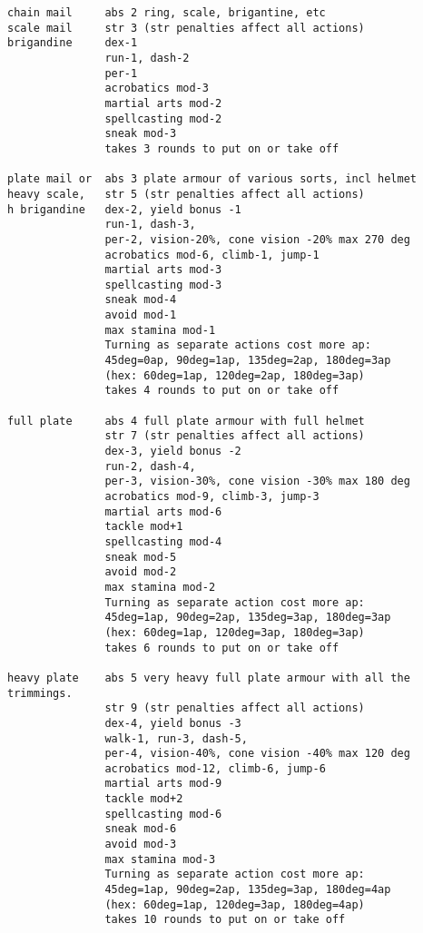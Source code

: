 \begin{verbatim}
chain mail     abs 2 ring, scale, brigantine, etc
scale mail     str 3 (str penalties affect all actions)
brigandine     dex-1
               run-1, dash-2
               per-1
               acrobatics mod-3
               martial arts mod-2
               spellcasting mod-2
               sneak mod-3
               takes 3 rounds to put on or take off

plate mail or  abs 3 plate armour of various sorts, incl helmet
heavy scale,   str 5 (str penalties affect all actions)
h brigandine   dex-2, yield bonus -1
               run-1, dash-3,
               per-2, vision-20%, cone vision -20% max 270 deg
               acrobatics mod-6, climb-1, jump-1
               martial arts mod-3
               spellcasting mod-3
               sneak mod-4
               avoid mod-1
               max stamina mod-1
               Turning as separate actions cost more ap:
               45deg=0ap, 90deg=1ap, 135deg=2ap, 180deg=3ap
               (hex: 60deg=1ap, 120deg=2ap, 180deg=3ap)
               takes 4 rounds to put on or take off

full plate     abs 4 full plate armour with full helmet
               str 7 (str penalties affect all actions)
               dex-3, yield bonus -2
               run-2, dash-4,
               per-3, vision-30%, cone vision -30% max 180 deg
               acrobatics mod-9, climb-3, jump-3
               martial arts mod-6
               tackle mod+1
               spellcasting mod-4
               sneak mod-5
               avoid mod-2
               max stamina mod-2
               Turning as separate action cost more ap:
               45deg=1ap, 90deg=2ap, 135deg=3ap, 180deg=3ap
               (hex: 60deg=1ap, 120deg=3ap, 180deg=3ap)
               takes 6 rounds to put on or take off

heavy plate    abs 5 very heavy full plate armour with all the trimmings.
               str 9 (str penalties affect all actions)
               dex-4, yield bonus -3
               walk-1, run-3, dash-5,
               per-4, vision-40%, cone vision -40% max 120 deg
               acrobatics mod-12, climb-6, jump-6
               martial arts mod-9
               tackle mod+2
               spellcasting mod-6
               sneak mod-6
               avoid mod-3
               max stamina mod-3
               Turning as separate action cost more ap:
               45deg=1ap, 90deg=2ap, 135deg=3ap, 180deg=4ap
               (hex: 60deg=1ap, 120deg=3ap, 180deg=4ap)
               takes 10 rounds to put on or take off
\end{verbatim}
\normalsize

